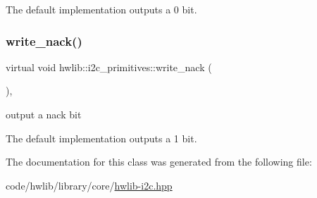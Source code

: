 The default implementation outputs a 0 bit. \mbox{\label{classhwlib_1_1i2c__primitives_a5ca312553bc0817ffecf5f90caf96396}} 
\subsubsection{\texorpdfstring{write\+\_\+nack()}{write\_nack()}}
{\footnotesize\ttfamily virtual void hwlib\+::i2c\+\_\+primitives\+::write\+\_\+nack (\begin{DoxyParamCaption}{ }\end{DoxyParamCaption})\hspace{0.3cm}{\ttfamily [inline]}, {\ttfamily [virtual]}}

output a nack bit

The default implementation outputs a 1 bit. 

The documentation for this class was generated from the following file\+:\begin{DoxyCompactItemize}
\item 
code/hwlib/library/core/\hyperlink{hwlib-i2c_8hpp}{hwlib-\/i2c.\+hpp}\end{DoxyCompactItemize}
